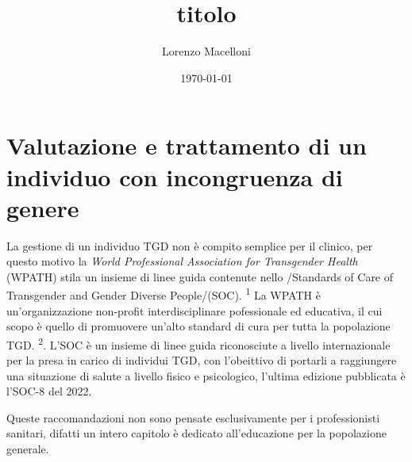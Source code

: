\documentclass[11pt]{article}
\author{Lorenzo Macelloni}
\date{\today}
\title{titolo}
\begin{document}
\maketitle
\tableofcontents

\section{Valutazione e trattamento di un individuo con incongruenza di genere}
\label{sec:org2c37482}

La gestione di un individuo TGD non è compito semplice per il clinico, per questo motivo la \emph{World Professional Association for Transgender Health} (WPATH) stila un insieme di linee guida contenute nello /Standards of Care of Transgender and Gender Diverse People/(SOC). \textsuperscript{1}
La WPATH è un'organizzazione non-profit interdisciplinare pofessionale ed educativa, il cui scopo è quello di promuovere un'alto standard di cura per tutta la popolazione TGD. \textsuperscript{2}.
L'SOC è un insieme di linee guida riconosciute a livello internazionale per la presa in carico di individui TGD, con l'obeittivo di portarli a raggiungere una situazione di salute a livello fisico e psicologico, l'ultima edizione pubblicata è l'SOC-8 del 2022.

Queste raccomandazioni non sono pensate esclusivamente per i professionisti sanitari, difatti un intero capitolo è dedicato all'educazione per la popolazione generale.
\end{document}
